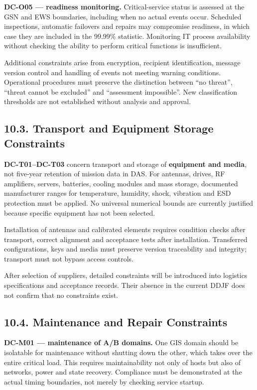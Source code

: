 \textbf{DC-O05 — readiness monitoring.} Critical-service status is assessed at the GSN and EWS boundaries, including when no actual events occur. Scheduled inspections, automatic failovers and repairs may compromise readiness, in which case they are included in the 99.99\% statistic. Monitoring IT process availability without checking the ability to perform critical functions is insufficient.

Additional constraints arise from encryption, recipient identification, message version control and handling of events not meeting warning conditions. Operational procedures must preserve the distinction between “no threat”, “threat cannot be excluded” and “assessment impossible”. New classification thresholds are not established without analysis and approval.

\subsection{10.3. Transport and Equipment Storage Constraints}\label{ddjf-10-3}

\textbf{DC-T01–DC-T03} concern transport and storage of \textbf{equipment and media}, not five-year retention of mission data in DAS. For antennas, drives, RF amplifiers, servers, batteries, cooling modules and mass storage, documented manufacturer ranges for temperature, humidity, shock, vibration and ESD protection must be applied. No universal numerical bounds are currently justified because specific equipment has not been selected.

Installation of antennas and calibrated elements requires condition checks after transport, correct alignment and acceptance tests after installation. Transferred configurations, keys and media must preserve version traceability and integrity; transport must not bypass access controls.

After selection of suppliers, detailed constraints will be introduced into logistics specifications and acceptance records. Their absence in the current DDJF does not confirm that no constraints exist.

\subsection{10.4. Maintenance and Repair Constraints}\label{ddjf-10-4}

\textbf{DC-M01 — maintenance of A/\allowbreak{}B domains.} One GIS domain should be isolatable for maintenance without shutting down the other, which takes over the entire critical load. This requires maintainability not only of hosts but also of networks, power and state recovery. Compliance must be demonstrated at the actual timing boundaries, not merely by checking service startup.

